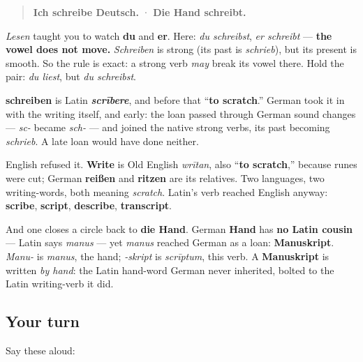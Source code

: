 \begin{quote}
\textbf{Ich schreibe Deutsch.} · \textbf{Die Hand schreibt.}
\end{quote}

\begin{grammarlens}[title={Grammar Lens: strong, but not here}]
\emph{Lesen} taught you to watch \textbf{du} and \textbf{er}. Here: \emph{du schreibst}, \emph{er schreibt} — \textbf{the vowel does not move.} \emph{Schreiben} is strong (its past is \emph{schrieb}), but its present is smooth. So the rule is exact: a strong verb \emph{may} break its vowel there. Hold the pair: \emph{du liest}, but \emph{du schreibst}.
\end{grammarlens}

\begin{cousinweb}
\textbf{schreiben} is Latin \emph{\textbf{scrībere}}, and before that \textquotedblleft{}\textbf{to scratch}.\textquotedblright{} German took it in with the writing itself, and early: the loan passed through German sound changes — \emph{sc-} became \emph{sch-} — and joined the native strong verbs, its past becoming \emph{schrieb}. A late loan would have done neither.

English refused it. \textbf{Write} is Old English \emph{wrītan}, also \textquotedblleft{}\textbf{to scratch},\textquotedblright{} because runes were cut; German \textbf{reißen} and \textbf{ritzen} are its relatives. Two languages, two writing-words, both meaning \emph{scratch}. Latin's verb reached English anyway: \textbf{scribe}, \textbf{script}, \textbf{describe}, \textbf{transcript}.

And one closes a circle back to \textbf{die Hand}. German \textbf{Hand} has \textbf{no Latin cousin} — Latin says \emph{manus} — yet \emph{manus} reached German as a loan: \textbf{Manuskript}. \emph{Manu-} is \emph{manus}, the hand; \emph{-skript} is \emph{scrīptum}, this verb. A \textbf{Manuskript} is written \emph{by hand}: the Latin hand-word German never inherited, bolted to the Latin writing-verb it did.
\end{cousinweb}

\subsection*{Your turn}
Say these aloud:

